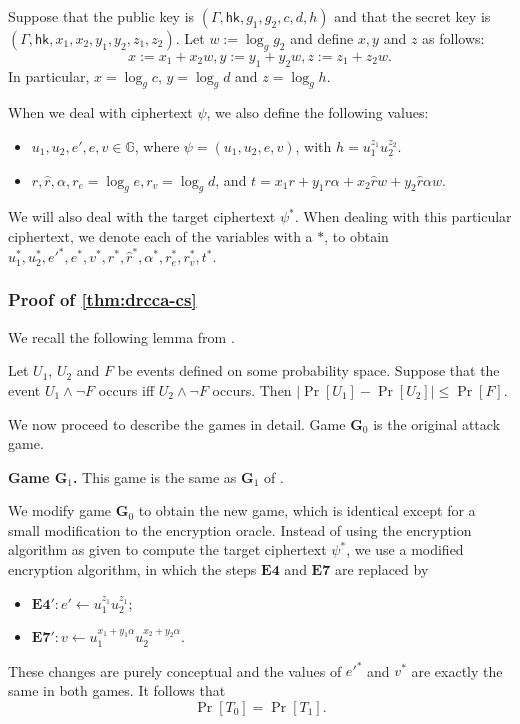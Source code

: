 \documentclass[10pt,a4paper]{article}
\newcommand{\G}{\mathbb{G}}
\newcommand{\hk}{\mathsf{hk}}
\newcommand{\game}{\mathbf{G}}
\newcommand{\estep}[1]{\mathbf{E#1}}
\begin{document}
	Suppose that the public key is $(\Gamma,\hk,g_1, g_2, c,d,h)$ and that the secret key is $(\Gamma,\hk,x_1,x_2,y_1,y_2,z_1,z_2)$. Let $w:=\log_{g}g_2$ and define $x,y$ and $z$ as follows: $$x:=x_1+x_2w, y:= y_1+y_2w, z:= z_1+z_2w.$$ In particular, $x=\log_{g}c$, $y=\log_gd$ and $z=\log_g h$.
	
	When we deal with ciphertext $\psi$, we also define the following values:
	\begin{itemize}
		\item $u_1,u_2,e',e,v\in\G$, where $\psi = (u_1,u_2,e,v)$, with $h = u_1^{z_1}u_2^{z_2}$.
		\item $r,\hat{r}, \alpha, r_e = \log_ge, r_v = \log_g d$, and $t = x_1r + y_1r\alpha + x_2\hat{r}w + y_2\hat{r}\alpha w$.
	\end{itemize}

	We will also deal with the target ciphertext $\psi^{*}$. When dealing with this particular ciphertext, we denote each of the variables with a $*$, to obtain $u_1^{*}, u_2^{*}, {e'}^{*}, e^{*}, v^{*}, r^{*},\hat{r}^{*}, \alpha^{*}, r_e^{*}, r_v^{*}, t^{*}.$

	\subsubsection{Proof of \cref{thm:drcca-cs}}
	
	We recall the following lemma from \cite{cs01}.
	
	\begin{lemma}
		Let $U_1$, $U_2$ and $F$ be events defined on some probability space. Suppose that the event $U_1\wedge\neg F$ occurs iff $U_2\wedge\neg F$ occurs. Then $|\Pr[U_1]-\Pr[U_2]|\leq\Pr[F]$.
	\end{lemma}

	We now proceed to describe the games in detail. Game $\game_0$ is the original attack game.
	
	\textbf{Game $\game_1$.} This game is the same as $\game_1$ of \cite{cs01}. 
	
	We modify game $\game_0$ to obtain the new game, which is identical except for a small modification to the encryption oracle. Instead of using the encryption algorithm as given to compute the target ciphertext $\psi^{*}$, we use a modified encryption algorithm, in which the steps $\estep{4}$ and $\estep{7}$ are replaced by 
	\begin{itemize}
		\item[] $\estep{4}': e'\gets u_1^{z_1}u_2^{z_1}$;
		\item[] $\estep{7}': v\gets u_1^{x_1+y_1\alpha}u_2^{x_2+y_2\alpha}$.
	\end{itemize}
	These changes are purely conceptual and the values of $e'^{*}$ and $v^{*}$ are exactly the same in both games. It follows that $$\Pr[T_0]=\Pr[T_1].$$
	
\end{document}
